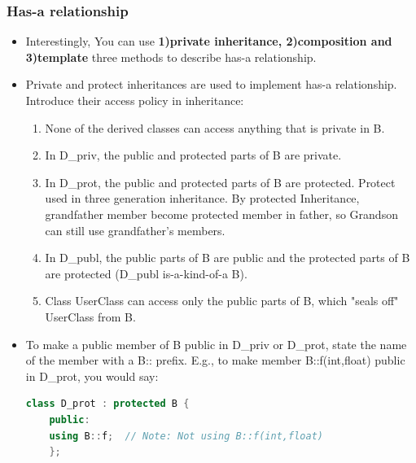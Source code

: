\documentclass[a4paper,12pt,twoside]{book}
\begin{document}
\subsubsection{Has-a relationship}

\begin{itemize}
	\item Interestingly, You can use \textbf{1)private inheritance, 2)composition and 3)template} three methods to describe has-a relationship.
	
	\item Private and protect inheritances are used to implement has-a relationship. Introduce their access policy in inheritance:
	\begin{enumerate}
		\begin{lstlisting}[frame=single, language=c++]
		class B                    { /*...*/ };
		class D_priv : private   B { /*...*/ };
		class D_prot : protected B { /*...*/ };
		class D_publ : public    B { /*...*/ };
		class UserClass            { B b; /*...*/ };
		\end{lstlisting}
		
		
		\item None of the derived classes can access anything that is private in B.
		
		\item In D\_priv, the public and protected parts of B are private.
		
		\item In D\_prot, the public and protected parts of B are protected. Protect used in three generation inheritance. By protected Inheritance, grandfather member become protected member in father, so Grandson can still use grandfather's members.
		
		\item In D\_publ, the public parts of  B are public and the protected parts of B are protected (D\_publ is-a-kind-of-a B).
		
		\item Class UserClass can access only the public parts of B, which "seals off" UserClass from B.
	\end{enumerate}
	
	
	\item To make a public member of B public in D\_priv or D\_prot, state the name of the member with a B:: prefix. E.g., to make member B::f(int,float) public in D\_prot, you would say:
	\begin{lstlisting}[frame=single, language=c++]
	class D_prot : protected B {
	public:
	using B::f;  // Note: Not using B::f(int,float)
	};
	\end{lstlisting}
	

\end{itemize}
\end{document}
